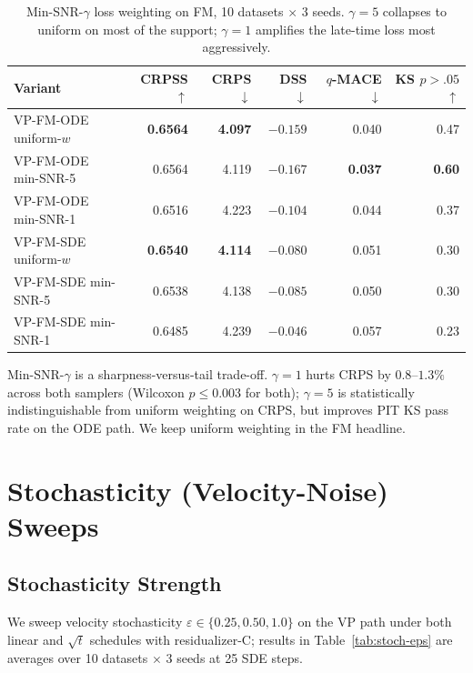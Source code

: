 \documentclass{uai2026}
\begin{document}
\begin{table}[!h]
  \centering
  \caption{Min-SNR-$\gamma$ loss weighting on FM, 10 datasets $\times$ 3 seeds. $\gamma=5$ collapses to uniform on most of the support; $\gamma=1$ amplifies the late-time loss most aggressively.}\label{tab:minsnr}
  \footnotesize
  \begin{tabular}{lrrrrr}
    \toprule
    Variant & CRPSS $\uparrow$ & CRPS $\downarrow$ & DSS $\downarrow$ & $q$-MACE $\downarrow$ & KS $p{>}.05$ $\uparrow$ \\
    \midrule
    VP-FM-ODE uniform-$w$ & \textbf{0.6564} & \textbf{4.097} & $-0.159$ & 0.040 & 0.47 \\
    VP-FM-ODE min-SNR-5   & 0.6564 & 4.119 & $-0.167$ & \textbf{0.037} & \textbf{0.60} \\
    VP-FM-ODE min-SNR-1   & 0.6516 & 4.223 & $-0.104$ & 0.044 & 0.37 \\
    VP-FM-SDE uniform-$w$ & \textbf{0.6540} & \textbf{4.114} & $-0.080$ & 0.051 & 0.30 \\
    VP-FM-SDE min-SNR-5   & 0.6538 & 4.138 & $-0.085$ & 0.050 & 0.30 \\
    VP-FM-SDE min-SNR-1   & 0.6485 & 4.239 & $-0.046$ & 0.057 & 0.23 \\
    \bottomrule
  \end{tabular}
\end{table}

Min-SNR-$\gamma$ is a sharpness-versus-tail trade-off. $\gamma=1$ hurts CRPS by $0.8$--$1.3\%$ across both samplers (Wilcoxon $p \leq 0.003$ for both); $\gamma=5$ is statistically indistinguishable from uniform weighting on CRPS, but improves PIT KS pass rate on the ODE path. We keep uniform weighting in the FM headline.

\section{Stochasticity (Velocity-Noise) Sweeps}\label{app:stoch}

\subsection{Stochasticity Strength}\label{app:stoch-eps}

We sweep velocity stochasticity $\varepsilon \in \{0.25, 0.50, 1.0\}$ on the VP path under both linear and $\sqrt{t}$ schedules with residualizer-C; results in Table~\ref{tab:stoch-eps} are averages over 10 datasets $\times$ 3 seeds at 25 SDE steps.
\end{document}
